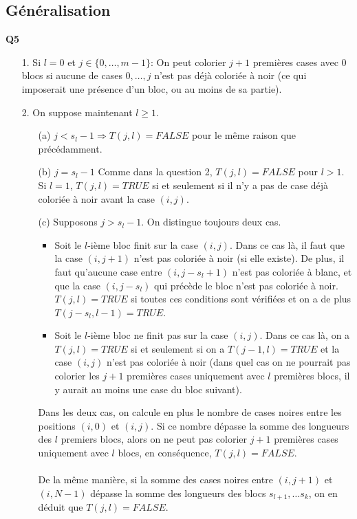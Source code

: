 \documentclass[10pt,a4paper]{article}
\begin{document}
\subsection{Généralisation}
\noindent\textbf{Q5} \\
\begin{itemize}
	\item[1.] Si $l = 0$ et $j \in \lbrace 0, \hdots, m-1 \rbrace$: On peut colorier $j+1$ premières cases avec 0 blocs si aucune de cases $0, \hdots, j$ n'est pas déjà coloriée à noir (ce qui imposerait une présence d'un bloc, ou au moins de sa partie). \\
	\item[2.] On suppose maintenant $l \geq 1$.
	\begin{itemize}
		\item[(a)] $j < s_l - 1 \Rightarrow T(j,l) = FALSE $ pour le même raison que précédamment.
		\item[(b)] $j = s_l -1$ Comme dans la question 2, $T(j,l) = FALSE $ pour $l>1$. Si $l=1$, $T(j,l) = TRUE$ si et seulement si il n'y a pas de case déjà coloriée à noir avant la case $(i,j)$.
		\item[(c)] Supposons $j > s_l -1$. On distingue toujours deux cas. 
		\begin{itemize}
		\item Soit le $l$-ième bloc finit sur la case $(i,j)$. Dans ce cas là, il faut que la case $(i,j+1)$ n'est pas coloriée à noir (si elle existe). De plus, il faut qu'aucune case entre $(i,j-s_l+1)$ n'est pas coloriée à blanc, et que la case $(i,j-s_l)$ qui précède le bloc n'est pas coloriée à noir. $T(j,l) = TRUE$ si toutes ces conditions sont vérifiées et on a de plus $T(j-s_l, l-1) = TRUE$. 
		\item Soit le $l$-ième bloc ne finit pas sur la case $(i,j)$. Dans ce cas là, on a $T(j,l) = TRUE$ si et seulement si on a $T(j-1,l) = TRUE$ et la case $(i,j)$ n'est pas coloriée à noir (dans quel cas on ne pourrait pas colorier les $j+1$ premières cases uniquement avec $l$ premières blocs, il y aurait au moins une case du bloc suivant).	\\	
		
		\end{itemize}
Dans les deux cas, on calcule en plus le nombre de cases noires entre les positions $(i,0)$ et $(i,j)$. Si ce nombre dépasse la somme des longueurs des $l$ premiers blocs, alors on ne peut pas colorier $j+1$ premières cases uniquement avec $l$ blocs, en conséquence, $T(j,l) = FALSE$. \\ \\
\noindent
De la même manière, si la somme des cases noires entre $(i,j+1) $ et $(i,N-1)$ dépasse la somme des longueurs des blocs $s_{l+1}, \hdots s_k$, on en déduit que $T(j,l) = FALSE$. 
	\end{itemize}
\end{itemize}
\end{document}
